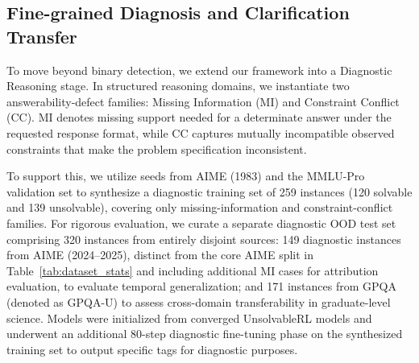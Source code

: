 \subsection{Fine-grained Diagnosis and Clarification Transfer}
\label{sec:diagnostic_reasoning}

To move beyond binary detection, we extend our framework into a Diagnostic Reasoning stage. In structured reasoning domains, we instantiate two answerability-defect families: Missing Information (MI) and Constraint Conflict (CC). MI denotes missing support needed for a determinate answer under the requested response format, while CC captures mutually incompatible observed constraints that make the problem specification inconsistent.

To support this, we utilize seeds from AIME (1983) and the MMLU-Pro validation set to synthesize a diagnostic training set of 259 instances (120 solvable and 139 unsolvable), covering only missing-information and constraint-conflict families. For rigorous evaluation, we curate a separate diagnostic OOD test set comprising 320 instances from entirely disjoint sources: 149 diagnostic instances from AIME (2024--2025), distinct from the core AIME split in Table~\ref{tab:dataset_stats} and including additional MI cases for attribution evaluation, to evaluate temporal generalization; and 171 instances from GPQA (denoted as GPQA-U) to assess cross-domain transferability in graduate-level science. Models were initialized from converged UnsolvableRL models and underwent an additional 80-step diagnostic fine-tuning phase on the synthesized training set to output specific tags for diagnostic purposes.


